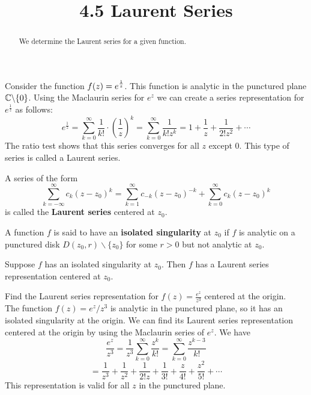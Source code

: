 \documentclass[handout]{ximera}
\title{4.5 Laurent Series}
\begin{document}
\begin{abstract}
We determine the Laurent series for a given function.
\end{abstract}

\maketitle

Consider the function $\displaystyle f(z) = e^\frac{1}{z}$. This function is analytic in the punctured plane $\mathbb C\backslash\{0\}$.
Using the Maclaurin series for $e^z$ we can create a series representation for $e^\frac{1}{z}$ as follows:
\[
e^\frac{1}{z} = \sum_{k=0}^\infty \frac{1}{k!} \cdot \left(\frac{1}{z}\right)^k = \sum_{k=0}^\infty \frac{1}{k!z^k} = 1+ \frac{1}{z} + \frac{1}{2! z^2} + \cdots
\]
 The ratio test shows that this series converges for all $z$ except $0$. This type of series is called a Laurent series.
 

\begin{definition} 
A series of the form 
\[
\sum_{k=-\infty}^\infty c_k(z-z_0)^k = \sum_{k=1}^\infty c_{-k}(z-z_0)^{-k} + \sum_{k=0}^\infty c_k(z-z_0)^k
\]
is called the \textbf{Laurent series} centered at $z_0$.
\end{definition}

\begin{definition}
A function $f$ is said to have an \textbf{isolated singularity} at $z_0$ if $f$ is analytic on a punctured disk $D(z_0, r)\backslash\{z_0\}$ for some $r>0$
but not analytic at $z_0$.
\end{definition}

\begin{theorem}
Suppose $f$ has an isolated singularity at $z_0$. Then $f$ has a Laurent series representation centered at $z_0$.
\end{theorem}

\begin{example}[example 1]
Find the Laurent series representation for $f(z) = \frac{e^z}{z^3}$ centered at the origin.\\
The function $f(z) = e^z/z^3$ is analytic in the punctured plane, so it has an isolated singularity at the origin.
We can find its Laurent series representation centered at the origin by using the Maclaurin series of $e^z$.
We have
\[
\frac{e^z}{z^3} = \frac{1}{z^3} \sum_{k=0}^\infty \frac{z^k}{k!} = \sum_{k=0}^\infty \frac{z^{k-3}}{k!} 
\]
\[
= \frac{1}{z^3} + \frac{1}{z^2} + \frac{1}{2!z} + \frac{1}{3!} + \frac{z}{4!} + \frac{z^2}{5!} + \cdots
\]
This representation is valid for all $z$ in the punctured plane.
\end{example}
\end{document}
